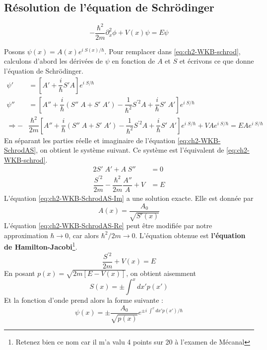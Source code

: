\documentclass{book}
\begin{document}
\subsection{Résolution de l'équation de Schrödinger}

\begin{equation}\label{eq:ch2-WKB-schrod}
  -\dfrac{\hbar^2}{2m} \partial_x ^2 \phi + V(x)\psi = E\psi
\end{equation}

Posons $\psi(x) = A(x) e^{i\; S(x)/\hbar}$. Pour remplacer dans \ref{eq:ch2-WKB-schrod}, calculons d'abord les dérivées de $\psi$ en fonction de $A$ et $S$ et écrivons ce que donne l'équation de Schrödinger.
\begin{align}
  \psi' &= \left[ A' + \dfrac{i}{\hbar} S' A\right]e^{i\; S/\hbar} \\
  \psi'' &= \left[A'' + \dfrac{i}{\hbar} (S''\; A + S'\; A') - \dfrac{1}{\hbar ^2} S^{\prime 2} A + \dfrac{i}{\hbar} S' \; A'\right] e ^{i\; S/\hbar} \\
  \Rightarrow -&\dfrac{\hbar ^2 }{2m} \left[A'' + \dfrac{i}{\hbar} (S''\; A + S'\; A') - \dfrac{1}{\hbar ^2} S^{\prime 2} A + \dfrac{i}{\hbar} S' \; A'\right] e ^{i\; S/\hbar} + VA e ^{i\; S/\hbar} = EA e ^{i\; S/\hbar} \label{eq:ch2-WKB-SchrodAS}
\end{align}
En séparant les parties réelle et imaginaire de l'équation \ref{eq:ch2-WKB-SchrodAS}, on obtient le système suivant. Ce système est l'équivalent de \ref{eq:ch2-WKB-schrod}.
\begin{align}
      2S' \; A' + A \; S'' &= 0 \label{eq:ch2-WKB-SchrodAS-Im} \\
      \dfrac{S^{\prime 2}}{2m} - \dfrac{\hbar ^2}{2m} \dfrac{A''}{A} + V &= E \label{eq:ch2-WKB-SchrodAS-Re} 
\end{align}
L'équation \ref{eq:ch2-WKB-SchrodAS-Im} a une solution exacte. Elle est donnée par 
\begin{equation}
  A(x) = \dfrac{A_0}{\sqrt{S'(x)}}
\end{equation}
L'équation \ref{eq:ch2-WKB-SchrodAS-Re} peut être modifiée par notre approximation $\hbar \longrightarrow 0$, car alors $\hbar ^2/2m \longrightarrow 0$. L'équation obtenue est \textbf{l'équation de Hamilton-Jacobi}\footnote{Retenez bien ce nom car il m'a valu 4 points sur 20 à l'examen de Mécanal}.
\begin{equation}
  \dfrac{S^{\prime 2}}{2m} + V(x) = E
\end{equation}
En posant $p(x) = \sqrt{2m[E - V(x)]}$, on obtient aisemment
\begin{equation}
  S(x) = \pm \int ^x d x' p(x')
\end{equation}
Et la fonction d'onde prend alors la forme suivante :
\begin{equation} \label{eq:ch2-WKB-solution}
  \psi(x) = \pm \dfrac{A_0}{\sqrt{p(x)}} e^{\pm i \; \int ^x d x' p(x')/\hbar}
\end{equation}
\end{document}
